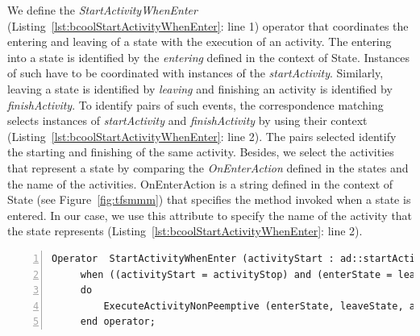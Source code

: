 	
We define the \emph{StartActivityWhenEnter} (Listing~\ref{lst:bcoolStartActivityWhenEnter}: line 1) operator that coordinates the entering and leaving of a state with the execution of an activity. The entering into a state is identified by the \dse \textit{entering} defined in the context of State. Instances of such \dse have to be coordinated with instances of the \dse \textit{startActivity}. Similarly, leaving a state is identified by \dse \textit{leaving} and finishing an activity is identified by \dse \textit{finishActivity}. To identify pairs of such events, the correspondence matching selects instances of \dse \emph{startActivity} and \emph{finishActivity} by using their context (Listing~\ref{lst:bcoolStartActivityWhenEnter}: line 2). The pairs selected identify the starting and finishing of the same activity. Besides, we select the activities that represent a state by comparing the \emph{OnEnterAction} defined in the states and the name of the activities. OnEnterAction is a string defined in the context of State (see Figure~\ref{fig:tfsmmm}) that specifies the method invoked when a state is entered. In our case, we use this attribute to specify the name of the activity that the state represents (Listing~\ref{lst:bcoolStartActivityWhenEnter}: line 2).
	
	 
	 \begin{lstlisting}[language=bcool,
	 caption={\bcool specification of the \emph{StartActivityWhenEnter} operator},
	 label={lst:bcoolStartActivityWhenEnter}, 
	 basicstyle=\scriptsize\ttfamily, backgroundcolor=\color{LGrey}, numbers=left, xleftmargin=2pt]
	 Operator  StartActivityWhenEnter (activityStart : ad::startActivity , activityStop : ad::finishActivity, enterState : tfsm::entering, leaveState : tfsm::leaving)
	 when ((activityStart = activityStop) and (enterState = leaveState) and (activityStart.name = enterState.onEnterAction));
	 do 
		 ExecuteActivityNonPeemptive (enterState, leaveState, activityStart, activityStop)
	 end operator;
	 \end{lstlisting}
	 
